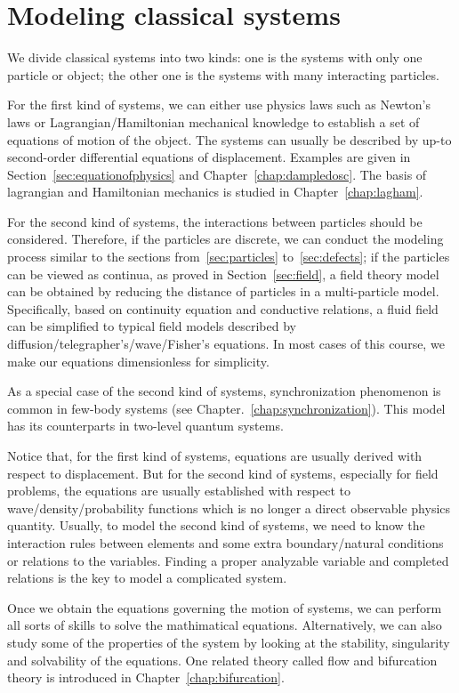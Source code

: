 \chapter{Modeling classical systems}

We divide classical systems into two kinds: one is the systems with only one particle or object; the other one is the systems with many interacting particles. 

For the first kind of systems, we can either use physics laws such as Newton's laws or Lagrangian/Hamiltonian mechanical knowledge to establish a set of equations of motion of the object. 
The systems can usually be described by up-to second-order differential equations of displacement. Examples are given in Section~\ref{sec:equationofphysics} and Chapter~\ref{chap:dampledosc}. The basis of lagrangian and Hamiltonian mechanics is studied in Chapter~\ref{chap:lagham}. 

For the second kind of systems, the interactions between particles should be considered. Therefore, if the particles are discrete, we can conduct the modeling process similar to the sections from~\ref{sec:particles} to~\ref{sec:defects}; if the particles can be viewed as continua, as proved in Section~\ref{sec:field}, a field theory model can be obtained by reducing the distance of particles in a multi-particle model. Specifically, based on continuity equation and conductive relations, a fluid field can be simplified to typical field models described by diffusion/telegrapher's/wave/Fisher's equations. In most cases of this course, we make our equations dimensionless for simplicity.

As a special case of the second kind of systems, synchronization phenomenon is common in few-body systems (see Chapter.~\ref{chap:synchronization}). This model has its counterparts in two-level quantum systems. 

Notice that, for the first kind of systems, equations are usually derived with respect to displacement. But for the second kind of systems, especially for field problems, the equations are usually established with respect to wave/density/probability functions which is no longer a direct observable physics quantity. Usually, to model the second kind of systems, we need to know the interaction rules between elements and some extra boundary/natural conditions or relations to the variables. Finding a proper analyzable variable and completed relations is the key to model a complicated system. 

Once we obtain the equations governing the motion of systems, we can perform all sorts of skills to solve the mathimatical equations. Alternatively, we can also study some of the properties of the system by looking at the stability, singularity and solvability of the equations. One related theory called flow and bifurcation theory is introduced in Chapter~\ref{chap:bifurcation}. 

